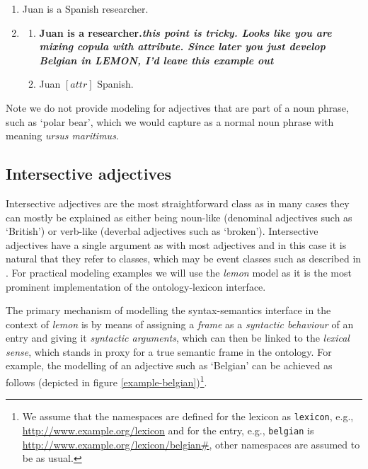 \documentclass[11pt]{article}
\begin{document}
\begin{enumerate}[resume]
\item Juan is a Spanish researcher. \label{ex:juan}
\item \begin{enumerate}
\item \textbf{Juan is a researcher.\textit{this point is tricky. Looks like you are mixing copula with attribute. Since later you just develop Belgian in LEMON, I'd leave this example out}}
\item Juan $[attr]$ Spanish.
\end{enumerate}
\label{ex:juan_frames}
\end{enumerate}

Note we do not provide modeling for adjectives that are part of a noun phrase,
such as `polar bear', which we would capture as a normal noun phrase with 
meaning \emph{ursus maritimus}.

\subsection{Intersective adjectives}

Intersective adjectives are the most straightforward class as in many cases they 
can mostly be explained as either being noun-like (denominal adjectives such as 
`British') or verb-like (deverbal adjectives such as `broken'). Intersective 
adjectives have a single argument as with most adjectives and in this case it is 
natural that they refer to classes, which may be event classes such as described 
in \cite{mccrae2014design}. For practical modeling examples we will use the
\emph{lemon} model as it is the most prominent implementation of the 
ontology-lexicon interface.

The primary mechanism of modelling the syntax-semantics interface in the context 
of \emph{lemon} is by means of assigning a \emph{frame} as a \emph{syntactic 
behaviour} of an entry and giving it \emph{syntactic arguments}, which can then 
be linked to the \emph{lexical sense}, which stands in proxy for a true semantic 
frame in the ontology. For example, the modelling of an adjective such as 
`Belgian' can be achieved as follows (depicted in figure 
\ref{example-belgian})\footnote{We assume that the namespaces are defined for 
the lexicon as {\tt lexicon}, e.g., \url{http://www.example.org/lexicon}
and for the entry, e.g., {\tt belgian} is \url{http://www.example.org/lexicon/belgian#},
other namespaces are assumed to be as usual.}.
\end{document}

